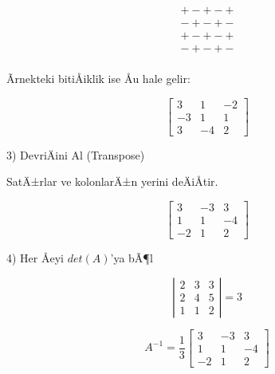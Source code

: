 \documentclass[12pt,fleqn]{article}\usepackage{../../common}
\begin{document}
$$ 
\begin{array}{rr}
+ - + - + \\
- + - + - \\
+ - + - + \\
- + - + - \\
\end{array}
 $$


Ãrnekteki bitiÅiklik ise Åu hale gelir:

$$ 
\left[\begin{array}{rrr}
3 & 1 & -2 \\
-3 & 1 & 1 \\
3 & -4 & 2
\end{array}\right]
 $$

3) DevriÄini Al (Transpose)

SatÄ±rlar ve kolonlarÄ±n yerini deÄiÅtir. 

$$ 
\left[\begin{array}{rrr}
3 & -3 & 3 \\
1 & 1 & -4 \\
-2 & 1 & 2
\end{array}\right]
 $$

4) Her Åeyi $det(A)$'ya bÃ¶l 

$$ 
\left|\begin{array}{rrr}
2 & 3 & 3 \\
2 & 4 & 5 \\
1 & 1 & 2
\end{array}\right| = 3
 $$

$$ A^{-1} = 
\frac{1}{3}
\left[\begin{array}{rrr}
3 & -3 & 3 \\
1 & 1 & -4 \\
-2 & 1 & 2
\end{array}\right]
 $$
\end{document}
